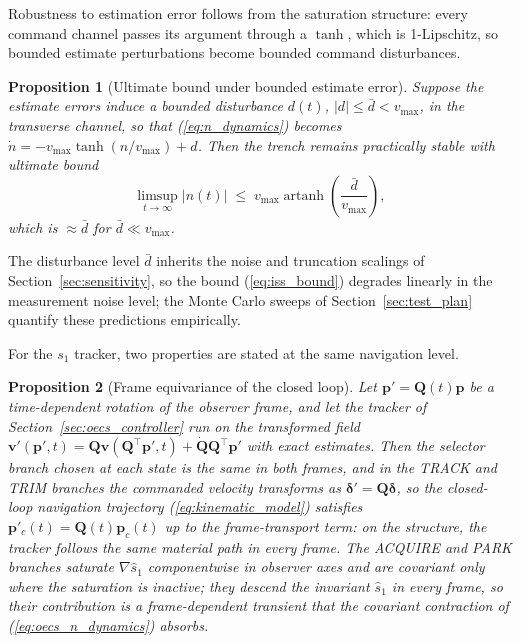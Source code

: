 \documentclass[lettersize,journal]{IEEEtran}
\newtheorem{proposition}{Proposition}
\begin{document}
Robustness to estimation error follows from the saturation structure:
every command channel passes its argument through a $\tanh$, which is
1-Lipschitz, so bounded estimate perturbations become bounded command
disturbances.

\begin{proposition}[Ultimate bound under bounded estimate error]
\label{prop:iss}
Suppose the estimate errors induce a bounded disturbance $d(t)$, $|d|
\leq \bar{d} < v_{\max}$, in the transverse channel, so that
(\ref{eq:n_dynamics}) becomes $\dot{n} = -v_{\max}\tanh(n/v_{\max}) +
d$. Then the trench remains practically stable with ultimate bound
\begin{equation}
    \limsup_{t\to\infty} |n(t)| \;\leq\;
    v_{\max}\operatorname{artanh}\!\left(\frac{\bar{d}}{v_{\max}}\right),
    \label{eq:iss_bound}
\end{equation}
which is $\approx \bar{d}$ for $\bar{d} \ll v_{\max}$.
\end{proposition}

The disturbance level $\bar{d}$ inherits the noise and truncation
scalings of Section~\ref{sec:sensitivity}, so the bound
(\ref{eq:iss_bound}) degrades linearly in the measurement noise level;
the Monte Carlo sweeps of Section~\ref{sec:test_plan} quantify these
predictions empirically.

For the $s_1$ tracker, two properties are stated at the same
navigation level.

\begin{proposition}[Frame equivariance of the closed loop]
\label{prop:equivariance}
Let $\mathbf{p}'= \mathbf{Q}(t)\mathbf{p}$ be a time-dependent rotation
of the observer frame, and let the tracker of
Section~\ref{sec:oecs_controller} run on the transformed field
$\mathbf{v}'(\mathbf{p}', t) = \mathbf{Q}\mathbf{v}(\mathbf{Q}^\top
\mathbf{p}', t) + \dot{\mathbf{Q}}\mathbf{Q}^\top\mathbf{p}'$ with
exact estimates. Then the selector branch chosen at each state is the
same in both frames, and in the TRACK and TRIM branches the commanded
velocity transforms as
$\boldsymbol{\delta}' = \mathbf{Q}\boldsymbol{\delta}$, so the
closed-loop navigation trajectory (\ref{eq:kinematic_model}) satisfies
$\mathbf{p}'_c(t) = \mathbf{Q}(t)\mathbf{p}_c(t)$ up to the
frame-transport term: on the structure, the tracker follows the same
material path in every frame. The ACQUIRE and PARK branches saturate
$\nabla\hat{s}_1$ componentwise in observer axes and are covariant only
where the saturation is inactive; they descend the invariant
$\hat{s}_1$ in every frame, so their contribution is a frame-dependent
transient that the covariant contraction of
(\ref{eq:oecs_n_dynamics}) absorbs.
\end{proposition}
\end{document}
